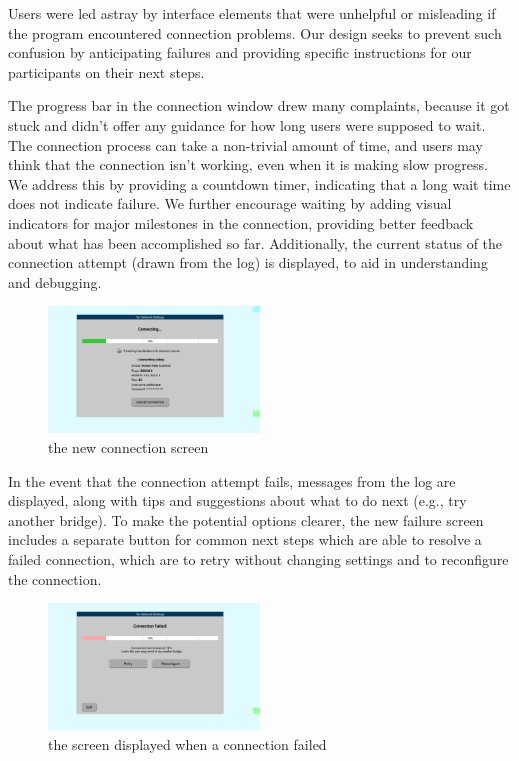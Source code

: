 \documentclass{template}
\begin{document}

Users were led astray by interface elements that were unhelpful or
misleading if the program encountered connection problems. Our design seeks to
prevent such confusion by anticipating failures and providing specific instructions
for our participants on their next steps.

The progress bar in the connection window drew many complaints, because it got
stuck and didn't offer any guidance for how long users were supposed to wait. 
The connection process can take a non-trivial amount of time, and users may
think that the connection isn't working, even when it is making slow progress. We
address this by providing a countdown timer, indicating that a long wait time does
not indicate failure. We further encourage waiting by adding visual indicators
for major milestones in the connection, providing better feedback about what has
been accomplished so far. Additionally, the current status of the connection
attempt (drawn from the log) is displayed, to aid in understanding and
debugging.

\begin{figure}[t]
\label{fig:redesign-waiting}
  \centering
    \includegraphics[width=0.5\textwidth]{redesign-waiting.png}
    \caption{the new connection screen}
\end{figure}

In the event that the connection attempt fails, messages from the log are
displayed, along with tips and suggestions about what to do next (e.g., try
another bridge). To make the potential options clearer, the new failure screen
includes a separate button for common next steps which are able to resolve
a failed connection, which are to retry without changing settings and to reconfigure 
the connection. \\

\begin{figure}[t]
\label{fig:redesign-failure}
  \centering
    \includegraphics[width=0.5\textwidth]{redesign-failure.png}
    \caption{the screen displayed when a connection failed}
\end{figure}
\end{document}
